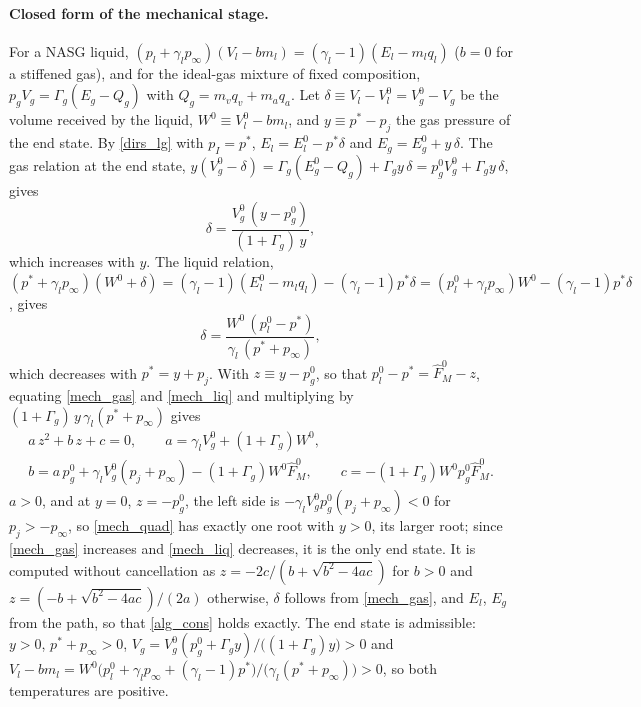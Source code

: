 \paragraph{Closed form of the mechanical stage.}
For a NASG liquid, $(p_l+\gamma_lp_\infty)(V_l-bm_l)=(\gamma_l-1)(E_l-m_lq_l)$ ($b=0$ for a stiffened gas), and for the ideal-gas mixture of fixed composition, $p_gV_g=\Gamma_g(E_g-Q_g)$ with $Q_g=m_vq_v+m_aq_a$. Let $\delta\equiv V_l-V_l^0=V_g^0-V_g$ be the volume received by the liquid, $W^0\equiv V_l^0-bm_l$, and $y\equiv p^*-p_{j}$ the gas pressure of the end state. By \eqref{dirs_lg} with $p_I=p^*$, $E_l=E_l^0-p^*\delta$ and $E_g=E_g^0+y\,\delta$. The gas relation at the end state, $y(V_g^0-\delta)=\Gamma_g(E_g^0-Q_g)+\Gamma_gy\,\delta=p_g^0V_g^0+\Gamma_gy\,\delta$, gives
\begin{equation}\label{mech_gas}
\delta=\frac{V_g^0\,(y-p_g^0)}{(1+\Gamma_g)\,y},
\end{equation}
which increases with $y$. The liquid relation, $(p^*+\gamma_lp_\infty)(W^0+\delta)=(\gamma_l-1)(E_l^0-m_lq_l)-(\gamma_l-1)p^*\delta=(p_l^0+\gamma_lp_\infty)W^0-(\gamma_l-1)p^*\delta$, gives
\begin{equation}\label{mech_liq}
\delta=\frac{W^0\,(p_l^0-p^*)}{\gamma_l\,(p^*+p_\infty)},
\end{equation}
which decreases with $p^*=y+p_{j}$. With $z\equiv y-p_g^0$, so that $p_l^0-p^*=\hat{F}_M^0-z$, equating \eqref{mech_gas} and \eqref{mech_liq} and multiplying by $(1+\Gamma_g)\,y\,\gamma_l(p^*+p_\infty)$ gives
\begin{equation}\label{mech_quad}
\begin{gathered}
a\,z^2+b\,z+c=0,\qquad a=\gamma_lV_g^0+(1+\Gamma_g)W^0,\\
b=a\,p_g^0+\gamma_lV_g^0(p_{j}+p_\infty)-(1+\Gamma_g)W^0\hat{F}_M^0,\qquad c=-(1+\Gamma_g)W^0p_g^0\hat{F}_M^0 .
\end{gathered}
\end{equation}
$a>0$, and at $y=0$, $z=-p_g^0$, the left side is $-\gamma_lV_g^0p_g^0(p_{j}+p_\infty)<0$ for $p_{j}>-p_\infty$, so \eqref{mech_quad} has exactly one root with $y>0$, its larger root; since \eqref{mech_gas} increases and \eqref{mech_liq} decreases, it is the only end state. It is computed without cancellation as $z=-2c/(b+\sqrt{b^2-4ac})$ for $b>0$ and $z=(-b+\sqrt{b^2-4ac})/(2a)$ otherwise, $\delta$ follows from \eqref{mech_gas}, and $E_l$, $E_g$ from the path, so that \eqref{alg_cons} holds exactly. The end state is admissible: $y>0$, $p^*+p_\infty>0$, $V_g=V_g^0(p_g^0+\Gamma_gy)/\bigl((1+\Gamma_g)y\bigr)>0$ and $V_l-bm_l=W^0\bigl(p_l^0+\gamma_lp_\infty+(\gamma_l-1)p^*\bigr)/\bigl(\gamma_l(p^*+p_\infty)\bigr)>0$, so both temperatures are positive.

